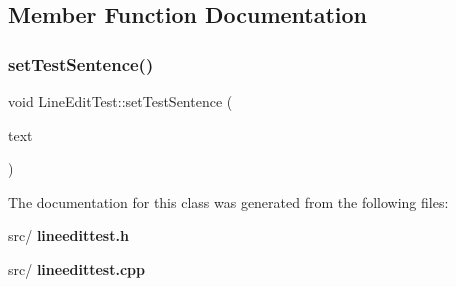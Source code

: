 \subsection{Member Function Documentation}
\mbox{\label{class_line_edit_test_a971bec2ec92bec3a6013422576b36f62}} 
\subsubsection{set\+Test\+Sentence()}
{\footnotesize\ttfamily void Line\+Edit\+Test\+::set\+Test\+Sentence (\begin{DoxyParamCaption}\item[{Q\+String}]{text }\end{DoxyParamCaption})}



The documentation for this class was generated from the following files\+:\begin{DoxyCompactItemize}
\item 
src/\textbf{ lineedittest.\+h}\item 
src/\textbf{ lineedittest.\+cpp}\end{DoxyCompactItemize}
